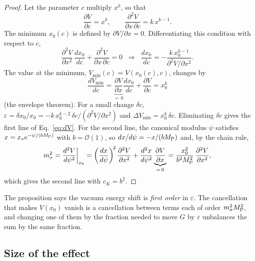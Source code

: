 \documentclass[aps,prd,reprint,superscriptaddress,nofootinbib,floatfix]{revtex4-2}
\theoremstyle{definition}
\newcommand{\MP}{M_{\rm P}}
\begin{document}
\begin{proof}
Let the parameter $c$ multiply $x^k$, so that
\begin{equation*}
\frac{\partial V}{\partial c}=x^k,\qquad \frac{\partial^2 V}{\partial x\,\partial c}=k\,x^{k-1}.
\end{equation*}
The minimum $x_0(c)$ is defined by $\partial V/\partial x=0$. Differentiating this condition with respect to $c$,
\begin{equation*}
\frac{\partial^2V}{\partial x^2}\,\frac{dx_0}{dc}+\frac{\partial^2V}{\partial x\,\partial c}=0
\;\;\Longrightarrow\;\;
\frac{dx_0}{dc}=-\frac{k\,x_0^{k-1}}{\partial^2V/\partial x^2}.
\end{equation*}
The value at the minimum, $V_{\min}(c)=V(x_0(c),c)$, changes by
\begin{equation*}
\frac{dV_{\min}}{dc}=\underbrace{\frac{\partial V}{\partial x}}_{=\,0}\frac{dx_0}{dc}+\frac{\partial V}{\partial c}=x_0^k
\end{equation*}
(the envelope theorem). For a small change $\delta c$, $\varepsilon=\delta x_0/x_0=-k\,x_0^{k-2}\,\delta c\big/(\partial^2V/\partial x^2)$ and $\Delta V_{\min}=x_0^k\,\delta c$. Eliminating $\delta c$ gives the first line of Eq.~\eqref{eq:dV}. For the second line, the canonical modulus $\psi$ satisfies $x=x_*e^{-\psi/(b\MP)}$ with $b=\mathcal{O}(1)$, so $dx/d\psi=-x/(b\MP)$ and, by the chain rule,
\begin{equation*}
m_\sigma^2=\frac{d^2V}{d\psi^2}\bigg|_{x_0}=\left(\frac{dx}{d\psi}\right)^{\!2}\frac{\partial^2V}{\partial x^2}+\frac{d^2x}{d\psi^2}\underbrace{\frac{\partial V}{\partial x}}_{=\,0}
=\frac{x_0^2}{b^2\MP^2}\,\frac{\partial^2V}{\partial x^2},
\end{equation*}
which gives the second line with $c_K=b^2$.
\end{proof}

The proposition says the vacuum energy shift is \emph{first order} in $\varepsilon$. The cancellation that makes $V(x_0)$ vanish is a cancellation between terms each of order $m_\sigma^2\MP^2$, and changing one of them by the fraction needed to move $G$ by $\varepsilon$ unbalances the sum by the same fraction.

\subsection{Size of the effect}
\end{document}
